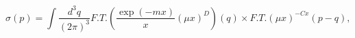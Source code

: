 \begin{equation}
\sigma(p)=\int\frac{d^{3}q}{(2\pi)^{3}}F.T.(\frac{\exp(-mx)}{x}(\mu
x)^{D})(q)\times F.T.(\mu x)^{-Cx}(p-q),
\end{equation}

